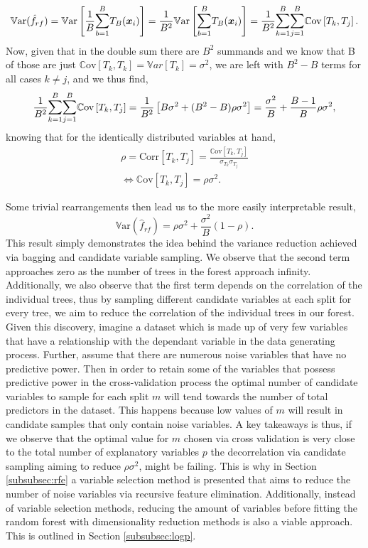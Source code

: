 \documentclass[a4paper,12pt, headsepline]{scrartcl}
\numberwithin{equation}{section}
\begin{document}
 \[
 \mathbb{V}\text{ar}(\hat f_{rf}) = \mathbb{V}\text{ar} \left[ \frac{1}{B} \mathlarger{\sum}\limits_{b = 1}^B T_B(\bm x_i) \right] = \frac{1}{B^2} \mathbb{V}\text{ar} \left[ \mathlarger{\sum}\limits_{b = 1}^B T_B(\bm x_i) \right] = \frac{1}{B^2} \mathlarger{\sum}\limits_{k = 1}^B \mathlarger{\sum}\limits_{j = 1}^B \mathbb{C}\text{ov} \left[T_k, T_j \right].
 \]
Now, given that in the double sum there are $B^2$ summands and we know that B of those are just $\mathbb{C}\text{ov}\left[T_k, T_k \right] = \mathbb{V}ar\left[T_k\right] = \sigma^2$, we are left with $B^2 - B$ terms for all cases $k \neq j$, and we thus find,
\[
\frac{1}{B^2} \mathlarger{\sum}\limits_{k = 1}^B \mathlarger{\sum}\limits_{j = 1}^B \mathbb{C}\text{ov} \left[T_k, T_j \right] = \frac{1}{B^2} \left[B\sigma^2 + (B^2 - B)\rho\sigma^2 \right] = \frac{\sigma^2}{B} +  \frac{B - 1}{B}\rho\sigma^2,
\]
knowing that for the identically distributed variables at hand,
\begin{gather*}
	\rho = \text{Corr}\left[T_k, T_j\right] =  \frac{\mathbb{C}\text{ov}\left[T_k, T_j \right]}{\sigma_{T_k}\sigma_{T_j}}\\
	\iff \mathbb{C}\text{ov}\left[T_k, T_j \right] = \rho\sigma^2.
\end{gather*}

Some trivial rearrangements then lead us to the more easily interpretable result,
\[
\mathbb{V}\text{ar}(\hat f_{rf}) = \rho\sigma^2 + \frac{\sigma^2}{B}(1 - \rho).
\]
This result simply demonstrates the idea behind the variance reduction achieved via bagging and candidate variable sampling. We observe that the second term approaches zero as the number of trees in the forest approach infinity. Additionally, we also observe that the first term depends on the correlation of the individual trees, thus by sampling different candidate variables at each split for every tree, we aim to reduce the correlation of the individual trees in our forest.\\
Given this discovery, imagine a dataset which is made up of very few variables that have a relationship with the dependant variable in the data generating process. Further, assume that there are numerous noise variables that have no predictive power. Then in order to retain some of the variables that possess predictive power in the cross-validation process the optimal number of candidate variables to sample for each split $m$ will tend towards the number of total predictors in the dataset. This happens because low values of $m$ will result in candidate samples that only contain noise variables. A key takeaways is thus, if we observe that the optimal value for $m$ chosen via cross validation is very close to the total number of explanatory variables $p$ the decorrelation via candidate sampling aiming to reduce $\rho\sigma^2$, might be failing. This is why in Section \ref{subsubsec:rfe} a variable selection method is presented that aims to reduce the number of noise variables via recursive feature elimination. Additionally, instead of variable selection methods, reducing the amount of variables before fitting the random forest with dimensionality reduction methods is also a viable approach. This is outlined in Section \ref{subsubsec:logp}.
\end{document}
